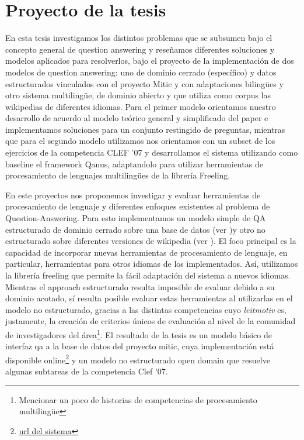 \section{Proyecto de la tesis}
\horrible


En esta tesis investigamos los distintos problemas que se subsumen bajo el concepto general de question answering y reseñamos diferentes soluciones y modelos aplicados para resolverlos, bajo el proyecto de la implementación de dos modelos de question answering: uno de dominio cerrado (específico) y datos estructurados vinculados con el proyecto Mitic y con adaptaciones bilingües y otro sistema multilingüe, de dominio abierto y que utiliza como corpus las wikipedias de diferentes idiomas. Para el primer modelo orientamos nuestro desarrollo de acuerdo al modelo teórico general y simplificado del paper \cite{QADB1} e implementamos soluciones para un conjunto restingido de preguntas, mientras que para el segundo modelo utilizamos nos orientamos con un subset de los ejercicios de la competencia CLEF '07 y desarrollamos el sistema utilizando como baseline el framework Qanus, adaptandolo para utilizar herramientas de procesamiento de lenguajes multilingües de la librería Freeling. 


En este proyectos nos proponemos investigar y evaluar herramientas de procesamiento de lenguaje y diferentes enfoques existentes al problema
de Question-Answering. Para esto implementamos un modelo simple de QA estructurado de dominio cerrado sobre una base de datos (ver )y otro 
no estructurado sobre diferentes versiones de wikipedia (ver ). El foco principal es la capacidad de incorporar nuevas herramientas de procesamiento de lenguaje, en particular,
herramientas para otros idiomas de los implementados. Así, utilizamos la librería freeling que permite la fácil adaptación del sistema a nuevos idiomas.
Mientras el approach estructurado resulta imposible de evaluar debido a su dominio acotado, sí resulta posible evaluar estas herramientas al utilizarlas en el modelo no estructurado, gracias a las distintas competencias cuyo \textit{leitmotiv} es, justamente, la creación de criterios únicos de evaluación al nivel de la comunidad de investigadores del área\footnote{{\color{red} Mencionar un poco de historias de competencias de procesamiento multilingüe}}. El resultado de la tesis es un modelo básico de interfaz qa a la base de datos del proyecto mitic, cuya implementación está disponible online\footnote{{\color{red}\url{url del sistema}}} y un modelo no estructurado open domain que resuelve algunas subtareas de la competencia Clef '07.

